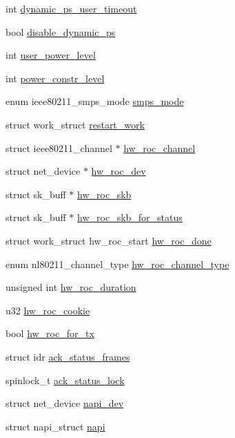\begin{DoxyCompactItemize}
\item 
int \hyperlink{structieee80211__local_a47de19fba894ad848cda173ecc4d47e7}{dynamic\-\_\-ps\-\_\-user\-\_\-timeout}
\item 
bool \hyperlink{structieee80211__local_a6b8c48108e6a22fba50ecf304fa6a4fc}{disable\-\_\-dynamic\-\_\-ps}
\item 
int \hyperlink{structieee80211__local_a769dfa727897d182933a132cf92c480e}{user\-\_\-power\-\_\-level}
\item 
int \hyperlink{structieee80211__local_ad1b75d23d03dca9da09d4d091c904e8f}{power\-\_\-constr\-\_\-level}
\item 
enum ieee80211\-\_\-smps\-\_\-mode \hyperlink{structieee80211__local_ae5063971b60ec8e964c6776eebe3f04f}{smps\-\_\-mode}
\item 
struct work\-\_\-struct \hyperlink{structieee80211__local_aa77ee6794b746189308aeeceb3635838}{restart\-\_\-work}
\item 
struct ieee80211\-\_\-channel $\ast$ \hyperlink{structieee80211__local_a5e8f22962db463298122a3ce5067f785}{hw\-\_\-roc\-\_\-channel}
\item 
struct net\-\_\-device $\ast$ \hyperlink{structieee80211__local_a34d7d070a0f447d2a535599a3dff3ac5}{hw\-\_\-roc\-\_\-dev}
\item 
struct sk\-\_\-buff $\ast$ \hyperlink{structieee80211__local_aeec3c84d01b2997932d8a704fb332392}{hw\-\_\-roc\-\_\-skb}
\item 
struct sk\-\_\-buff $\ast$ \hyperlink{structieee80211__local_a3348475145fcc551a07a06e481f06837}{hw\-\_\-roc\-\_\-skb\-\_\-for\-\_\-status}
\item 
struct work\-\_\-struct hw\-\_\-roc\-\_\-start \hyperlink{structieee80211__local_a471bd977ec2f7b650195b9ce384150ad}{hw\-\_\-roc\-\_\-done}
\item 
enum nl80211\-\_\-channel\-\_\-type \hyperlink{structieee80211__local_a9b00b6c7042a2ae7a8ad5490f4017efa}{hw\-\_\-roc\-\_\-channel\-\_\-type}
\item 
unsigned int \hyperlink{structieee80211__local_af4abb221fc61238c80b3b5c96f5d3c7b}{hw\-\_\-roc\-\_\-duration}
\item 
u32 \hyperlink{structieee80211__local_af36d3ae3e1d2447d84f160e433e5be2e}{hw\-\_\-roc\-\_\-cookie}
\item 
bool \hyperlink{structieee80211__local_a7c4c5a9a800b0b54327da5a44b95f562}{hw\-\_\-roc\-\_\-for\-\_\-tx}
\item 
struct idr \hyperlink{structieee80211__local_a94ad6f2bba1c98eb6d70944990d275d1}{ack\-\_\-status\-\_\-frames}
\item 
spinlock\-\_\-t \hyperlink{structieee80211__local_aaafe5cc995adaa9d3c6d1a5bb9117189}{ack\-\_\-status\-\_\-lock}
\item 
struct net\-\_\-device \hyperlink{structieee80211__local_aac1852a9def07663ebe91ac3d74cc313}{napi\-\_\-dev}
\item 
struct napi\-\_\-struct \hyperlink{structieee80211__local_ad7946e6f4ab63e48db691b15b9a961d5}{napi}
\end{DoxyCompactItemize}


